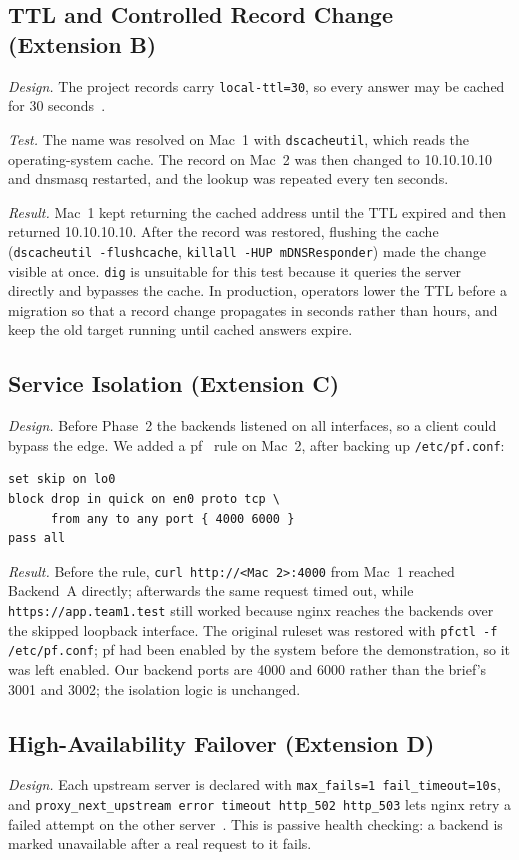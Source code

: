 \documentclass[conference]{IEEEtran}
\newcommand{\cmd}[1]{\texttt{#1}}
\begin{document}
\subsection{TTL and Controlled Record Change (Extension B)}
\textit{Design.} The project records carry \cmd{local-ttl=30}, so every answer may be cached for 30 seconds~\cite{rfc1034}.

\textit{Test.} The name was resolved on Mac~1 with \cmd{dscacheutil}, which reads the operating-system cache. The record on Mac~2 was then changed to 10.10.10.10 and dnsmasq restarted, and the lookup was repeated every ten seconds.

\textit{Result.} Mac~1 kept returning the cached address until the TTL expired and then returned 10.10.10.10. After the record was restored, flushing the cache (\cmd{dscacheutil -flushcache}, \cmd{killall -HUP mDNSResponder}) made the change visible at once. \cmd{dig} is unsuitable for this test because it queries the server directly and bypasses the cache. In production, operators lower the TTL before a migration so that a record change propagates in seconds rather than hours, and keep the old target running until cached answers expire.

\subsection{Service Isolation (Extension C)}
\textit{Design.} Before Phase~2 the backends listened on all interfaces, so a client could bypass the edge. We added a pf~\cite{pf} rule on Mac~2, after backing up \cmd{/etc/pf.conf}:
\begin{lstlisting}
set skip on lo0
block drop in quick on en0 proto tcp \
      from any to any port { 4000 6000 }
pass all
\end{lstlisting}

\textit{Result.} Before the rule, \cmd{curl http://<Mac 2>:4000} from Mac~1 reached Backend~A directly; afterwards the same request timed out, while \cmd{https://app.team1.test} still worked because nginx reaches the backends over the skipped loopback interface. The original ruleset was restored with \cmd{pfctl -f /etc/pf.conf}; pf had been enabled by the system before the demonstration, so it was left enabled. Our backend ports are 4000 and 6000 rather than the brief's 3001 and 3002; the isolation logic is unchanged.

\subsection{High-Availability Failover (Extension D)}
\textit{Design.} Each upstream server is declared with \cmd{max\_fails=1 fail\_timeout=10s}, and \cmd{proxy\_next\_upstream error timeout http\_502 http\_503} lets nginx retry a failed attempt on the other server~\cite{nginxup}. This is passive health checking: a backend is marked unavailable after a real request to it fails.
\end{document}

